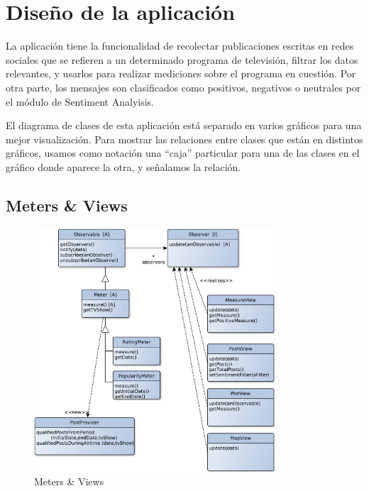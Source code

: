  

\section{Diseño de la aplicación}


La aplicación tiene la funcionalidad de recolectar publicaciones escritas en redes sociales que se refieren a un determinado programa de televisión, filtrar los datos relevantes, y usarlos para realizar mediciones sobre el programa en cuestión. 
Por otra parte, los mensajes son clasificados como positivos, negativos o neutrales por el módulo de Sentiment Analyisis.
\medskip

El diagrama de clases de esta aplicación está separado en varios gráficos para una mejor visualización. Para mostrar las relaciones entre clases que están en distintos gráficos, usamos como notación una ``caja'' particular para una de las clases en el gráfico donde aparece la otra, y señalamos la relación.

\subsection{Meters \& Views}

\begin{figure}[H]
\centering
\includegraphics[width=0.8\textwidth]{graph/clase/meters.pdf}
\caption{Meters \& Views}
\end{figure}

